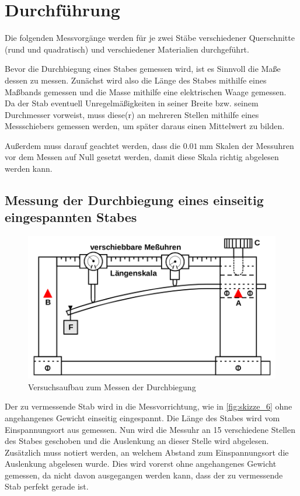 \section{Durchführung}
\label{sec:Durchführung}

Die folgenden Messvorgänge werden für je zwei Stäbe verschiedener Querschnitte (rund und quadratisch) und verschiedener Materialien durchgeführt.

Bevor die Durchbiegung eines Stabes gemessen wird, ist es Sinnvoll die Maße dessen zu messen.
Zunächst wird also die Länge des Stabes mithilfe eines Maßbands gemessen und die Masse mithilfe eine elektrischen Waage gemessen.
Da der Stab eventuell Unregelmäßigkeiten in seiner Breite bzw. seinem Durchmesser vorweist, muss diese(r) an mehreren Stellen mithilfe eines Messschiebers gemessen werden, um später daraus einen Mittelwert zu bilden.

Außerdem muss darauf geachtet werden, dass die $\SI{0.01}{\milli\meter}$ Skalen der Messuhren vor dem Messen auf Null gesetzt werden, damit diese Skala richtig abgelesen werden kann.

\subsection{Messung der Durchbiegung eines einseitig eingespannten Stabes}
\label{sec:Durchführung_Einseitig}

\begin{figure}
    \centering
    \includegraphics[width=\textwidth]{images/skizze_6.png}
    \caption{Versuchsaufbau zum Messen der Durchbiegung\cite{V103}}
    \label{fig:skizze_6}
\end{figure}

Der zu vermessende Stab wird in die Messvorrichtung, wie in \autoref{fig:skizze_6} ohne angehangenes Gewicht einseitig eingespannt.
Die Länge des Stabes wird vom Einspannungsort aus gemessen.
Nun wird die Messuhr an 15 verschiedene Stellen des Stabes geschoben und die Auslenkung an dieser Stelle wird abgelesen. Zusätzlich muss notiert werden, an welchem Abstand zum Einspannungsort die Auslenkung abgelesen wurde.
Dies wird vorerst ohne angehangenes Gewicht gemessen, da nicht davon ausgegangen werden kann, dass der zu vermessende Stab perfekt gerade ist.

